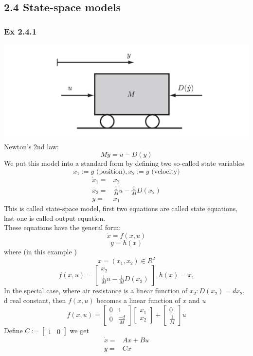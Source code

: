 \documentclass[letterpaper]{article}
\begin{document}
\subsection*{2.4 State-space models}
\subsubsection*{Ex 2.4.1}
\includegraphics[scale=0.5]{images/EX2_4_1.png}\\
Newton's 2nd law: $$M\ddot y=u-D(\dot y)$$
We put this model into a standard form by defining two so-called state variables
$$x_1:=y \text{ (position)}, x_2:=\dot y \text{ (velocity)}$$
\begin{align*}
  \dot x_1= & x_2                              \\
  \dot x_2= & \frac{1}{M}u - \frac{1}{M}D(x_2) \\
  y=        & x_1                              
\end{align*}
This is called state-space model, first two equations are called state equations, last one is called output equation.\\
These equations have the general form: $$\dot x=f(x,u)$$ $$y=h(x)$$ where (in this example ) $$x=(x_1,x_2)\in R^2$$ $$f(x,u)=\begin{bmatrix}x_2\\ \frac{1}{M}u-\frac{1}{M}D(x_2)\end{bmatrix}, h(x)=x_1$$
In the special case, where air resistance is a linear function of $x_2:D(x_2)=dx_2$, d real constant, then $f(x,u)$ becomes a linear function of $x$ and $u$
$$f(x,u)=
\begin{bmatrix} 
  0 & 1 \\0&\frac{-d}{M}
\end{bmatrix} 
\begin{bmatrix} 
  x_1 \\x_2
\end{bmatrix} +
\begin{bmatrix} 
  0 \\\frac{1}{M}
\end{bmatrix}
u$$
Define 
$C:= 
\begin{bmatrix}
  1 & 0 
\end{bmatrix}$
we get 
\begin{align*}
  \dot x= & Ax+Bu \\
  y=      & Cx    
\end{align*}
\end{document}
